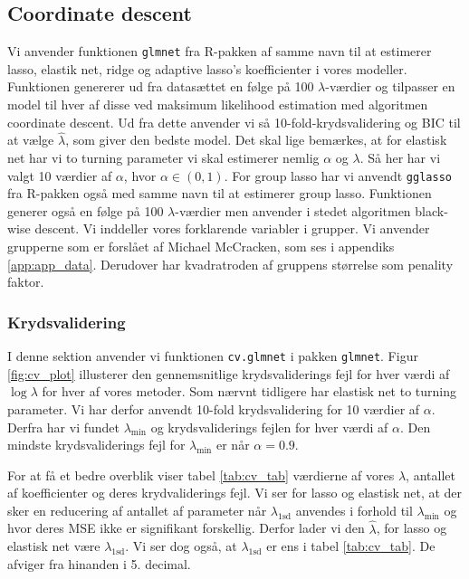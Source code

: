 \subsection{Coordinate descent}
Vi anvender funktionen \texttt{glmnet} fra R-pakken af samme navn til at estimerer lasso, elastik net, ridge og adaptive lasso's koefficienter i vores modeller. Funktionen genererer ud fra datasættet en følge på 100 $\lambda$-værdier og tilpasser en model til hver af disse ved maksimum likelihood estimation med algoritmen coordinate descent. 
Ud fra dette anvender vi så 10-fold-krydsvalidering og BIC til at vælge $\widehat{\lambda}$, som giver den bedste model. 
Det skal lige bemærkes, at for elastisk net har vi to turning parameter vi skal estimerer nemlig $\alpha$ og $\lambda$.  Så her har vi valgt 10 værdier af  $\alpha$, hvor $\alpha \in (0,1)$. 
For group lasso har vi anvendt \texttt{gglasso} fra R-pakken også med samme navn til at estimerer group lasso. 
Funktionen generer også en følge på 100 $\lambda$-værdier men anvender i stedet algoritmen black-wise descent. 
Vi inddeller vores forklarende variabler i grupper. Vi anvender grupperne som er forslået af Michael McCracken, som ses i appendiks \ref{app:app_data}. Derudover har kvadratroden af gruppens størrelse som penality faktor. 

\subsubsection{Krydsvalidering}
I denne sektion anvender vi funktionen \texttt{cv.glmnet} i pakken \texttt{glmnet}. 
Figur \ref{fig:cv_plot} illusterer den gennemsnitlige krydsvaliderings fejl for hver værdi af $\log \lambda$ for hver af vores metoder.
Som nærvnt tidligere har elastisk net to turning parameter. Vi har derfor anvendt 10-fold krydsvalidering for 10 værdier af $\alpha$. Derfra har vi fundet  $\lambda_{\min}$ og krydsvaliderings fejlen for hver værdi af $\alpha$.  
Den mindste krydsvaliderings fejl for $\lambda_{\min}$ er når $\alpha =0.9$. 




For at få et bedre overblik viser tabel  \ref{tab:cv_tab} værdierne af vores $\lambda$, antallet af koefficienter og deres krydvaliderings fejl. 
Vi ser for lasso og elastisk net, at der sker en reducering af antallet af parameter når $\lambda_{1\text{sd}}$ anvendes i forhold til $\lambda_{\min}$ og hvor deres MSE ikke er signifikant forskellig.  
Derfor lader vi den $\widehat{\lambda}$, for lasso og elastisk net være $\lambda_{1\text{sd}}$.
Vi ser dog også, at $\lambda_{1\text{sd}}$ er ens i tabel \ref{tab:cv_tab}. 
De afviger fra hinanden i 5. decimal.  

